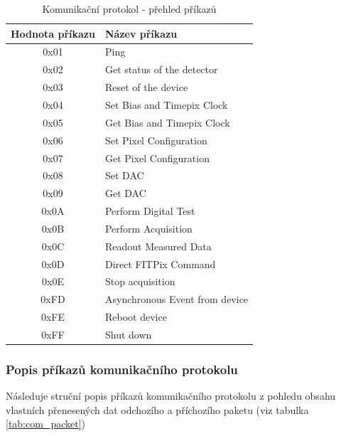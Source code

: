\begin{table}[th]
	\begin{center}
		\begin{tabular}{|c|l|}
			\hline
			\textbf{Hodnota příkazu} & \textbf{Název příkazu} \\
			\hline
			0x01 & Ping \\
			\hline
			0x02 & Get status of the detector \\
			\hline
			0x03 & Reset of the device \\
			\hline
			0x04 & Set Bias and Timepix Clock \\
			\hline
			0x05 & Get Bias and Timepix Clock \\
			\hline
			0x06 & Set Pixel Configuration \\
			\hline
			0x07 & Get Pixel Configuration \\
			\hline
			0x08 & Set DAC \\
			\hline
			0x09 & Get DAC \\
			\hline
			0x0A & Perform Digital Test \\
			\hline
			0x0B & Perform Acquisition \\
			\hline
			0x0C & Readout Measured Data \\
			\hline
			0x0D & Direct FITPix Command \\
			\hline
			0x0E & Stop acquisition \\
			\hline
			0xFD & Asynchronous Event from device \\
			\hline
			0xFE & Reboot device \\
			\hline
			0xFF & Shut down \\
			\hline
			\end{tabular}
	\end{center}
	\caption{Komunikační protokol - přehled příkazů}
	\label{tab:commands}
\end{table}

\subsubsection{Popis příkazů komunikačního protokolu}
Následuje struční popis příkazů komunikačního protokolu z pohledu obsahu vlastních přenesených dat odchozího a příchozího paketu (viz tabulka \ref{tab:com_packet})


